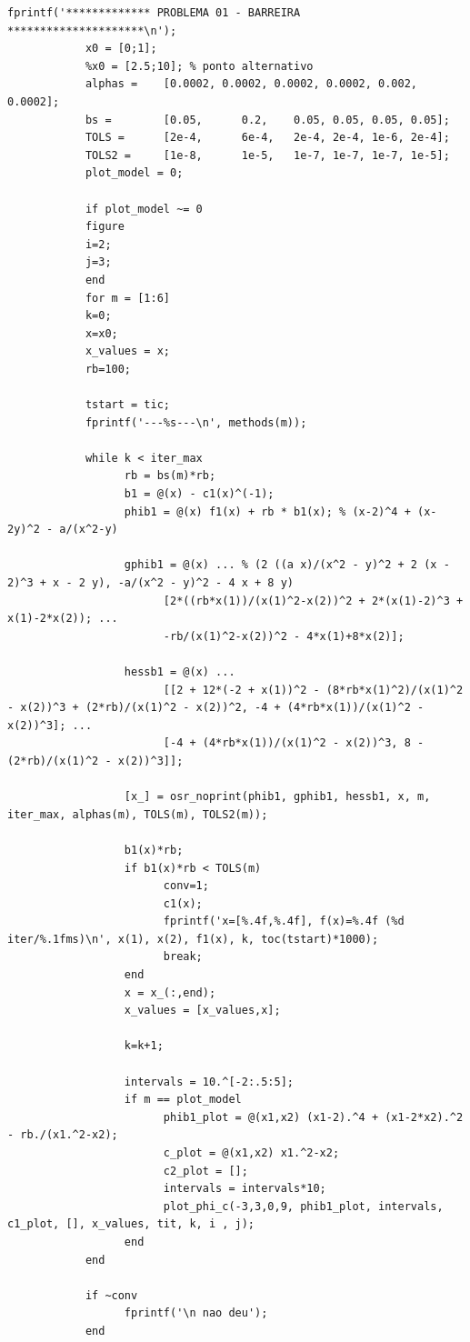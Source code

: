 \documentclass[10pt, a4paper]{article}
\begin{document}
\begin{minipage}{\linewidth}
      \begin{lstlisting}[style=myStyle, caption= trecho de c\'odigo do problema 01 (barreira), label=list_p01_bar]
            fprintf('************* PROBLEMA 01 - BARREIRA *********************\n');
            x0 = [0;1];
            %x0 = [2.5;10]; % ponto alternativo
            alphas =    [0.0002, 0.0002, 0.0002, 0.0002, 0.002, 0.0002];
            bs =        [0.05,      0.2,    0.05, 0.05, 0.05, 0.05];
            TOLS =      [2e-4,      6e-4,   2e-4, 2e-4, 1e-6, 2e-4];
            TOLS2 =     [1e-8,      1e-5,   1e-7, 1e-7, 1e-7, 1e-5];
            plot_model = 0;

            if plot_model ~= 0
            figure
            i=2;
            j=3;
            end
            for m = [1:6]
            k=0;
            x=x0;
            x_values = x;
            rb=100;

            tstart = tic;
            fprintf('---%s---\n', methods(m));

            while k < iter_max
                  rb = bs(m)*rb;
                  b1 = @(x) - c1(x)^(-1);
                  phib1 = @(x) f1(x) + rb * b1(x); % (x-2)^4 + (x-2y)^2 - a/(x^2-y)

                  gphib1 = @(x) ... % (2 ((a x)/(x^2 - y)^2 + 2 (x - 2)^3 + x - 2 y), -a/(x^2 - y)^2 - 4 x + 8 y)
                        [2*((rb*x(1))/(x(1)^2-x(2))^2 + 2*(x(1)-2)^3 + x(1)-2*x(2)); ...
                        -rb/(x(1)^2-x(2))^2 - 4*x(1)+8*x(2)];

                  hessb1 = @(x) ...
                        [[2 + 12*(-2 + x(1))^2 - (8*rb*x(1)^2)/(x(1)^2 - x(2))^3 + (2*rb)/(x(1)^2 - x(2))^2, -4 + (4*rb*x(1))/(x(1)^2 - x(2))^3]; ...
                        [-4 + (4*rb*x(1))/(x(1)^2 - x(2))^3, 8 - (2*rb)/(x(1)^2 - x(2))^3]];

                  [x_] = osr_noprint(phib1, gphib1, hessb1, x, m, iter_max, alphas(m), TOLS(m), TOLS2(m));

                  b1(x)*rb;
                  if b1(x)*rb < TOLS(m)
                        conv=1;
                        c1(x);
                        fprintf('x=[%.4f,%.4f], f(x)=%.4f (%d iter/%.1fms)\n', x(1), x(2), f1(x), k, toc(tstart)*1000);
                        break;
                  end
                  x = x_(:,end);
                  x_values = [x_values,x];

                  k=k+1;

                  intervals = 10.^[-2:.5:5];
                  if m == plot_model
                        phib1_plot = @(x1,x2) (x1-2).^4 + (x1-2*x2).^2 - rb./(x1.^2-x2);
                        c_plot = @(x1,x2) x1.^2-x2;
                        c2_plot = [];
                        intervals = intervals*10;
                        plot_phi_c(-3,3,0,9, phib1_plot, intervals, c1_plot, [], x_values, tit, k, i , j);
                  end
            end

            if ~conv
                  fprintf('\n nao deu');
            end
      \end{lstlisting}
\end{minipage}
\end{document}
